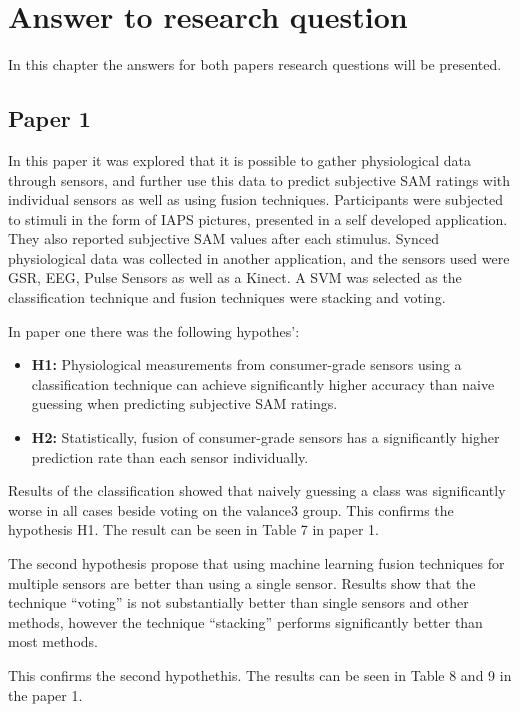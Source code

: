 \chapter{Answer to research question}
In this chapter the answers for both papers research questions will be presented.
\section{Paper 1}
In this paper it was explored that it is possible to gather physiological data through sensors, and further use this data to predict subjective SAM ratings with individual sensors as well as using fusion techniques. 
Participants were subjected to stimuli in the form of IAPS pictures, presented in a self developed application. 
They also reported subjective SAM values after each stimulus. 
Synced physiological data was collected in another application, and the sensors used were GSR, EEG, Pulse Sensors as well as a Kinect.
A SVM was selected as the classification technique and fusion techniques were stacking and voting.

In paper one there was the following hypothes':
\begin{itemize}
    \item \textbf{H1:} Physiological measurements from consumer-grade sensors using a classification technique can achieve significantly higher accuracy than naive guessing when predicting subjective SAM ratings.
    \item \textbf{H2:} Statistically, fusion of consumer-grade sensors has a significantly
higher prediction rate than each sensor individually.
\end{itemize}

Results of the classification showed that naively guessing a class was significantly worse in all cases beside voting on the valance3 group. 
This confirms the hypothesis H1. The result can be seen in Table 7 in paper 1.

The second hypothesis propose that using machine learning fusion techniques for multiple sensors are better than using a single sensor. 
Results show that the technique ``voting'' is not substantially better than single sensors and other methods, however the technique ``stacking'' performs significantly better than most methods. 

This confirms the second hypothethis. The results can be seen in Table 8 and 9 in the paper 1.

